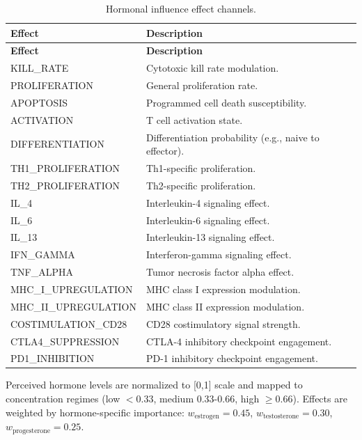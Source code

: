 \begin{longtable}{lp{9cm}}
\caption{Hormonal influence effect channels.}
\label{tab:hormonal-effects} \\
\toprule
\textbf{Effect} & \textbf{Description} \\
\midrule
\endfirsthead
\toprule
\textbf{Effect} & \textbf{Description} \\
\midrule
\endhead
\bottomrule
\endlastfoot
KILL\_RATE            & Cytotoxic kill rate modulation. \\
PROLIFERATION         & General proliferation rate. \\
APOPTOSIS             & Programmed cell death susceptibility. \\
ACTIVATION            & T cell activation state. \\
DIFFERENTIATION       & Differentiation probability (e.g., naive to effector). \\
TH1\_PROLIFERATION    & Th1-specific proliferation. \\
TH2\_PROLIFERATION    & Th2-specific proliferation. \\
IL\_4                 & Interleukin-4 signaling effect. \\
IL\_6                 & Interleukin-6 signaling effect. \\
IL\_13                & Interleukin-13 signaling effect. \\
IFN\_GAMMA            & Interferon-gamma signaling effect. \\
TNF\_ALPHA            & Tumor necrosis factor alpha effect. \\
MHC\_I\_UPREGULATION  & MHC class I expression modulation. \\
MHC\_II\_UPREGULATION & MHC class II expression modulation. \\
COSTIMULATION\_CD28   & CD28 costimulatory signal strength. \\
CTLA4\_SUPPRESSION    & CTLA-4 inhibitory checkpoint engagement. \\
PD1\_INHIBITION       & PD-1 inhibitory checkpoint engagement. \\
\end{longtable}

Perceived hormone levels are normalized to [0,1] scale and mapped to concentration regimes (low $<0.33$, medium $0.33$-$0.66$, high $\geq 0.66$). Effects are weighted by hormone-specific importance: $w_{\text{estrogen}} = 0.45$, $w_{\text{testosterone}} = 0.30$, $w_{\text{progesterone}} = 0.25$.

